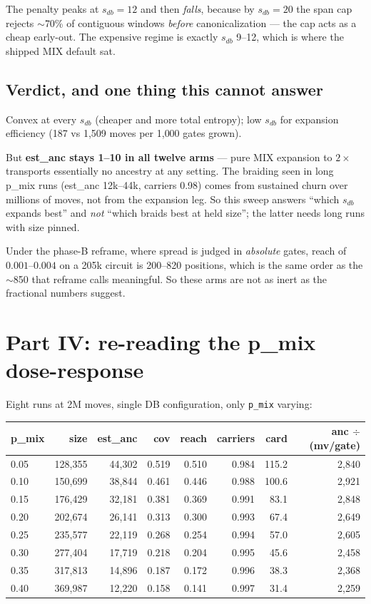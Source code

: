 \documentclass[11pt]{article}
\newcommand{\code}[1]{\texttt{#1}}
\begin{document}
The penalty peaks at $s_{db}=12$ and then \emph{falls}, because by $s_{db}=20$
the span cap rejects $\sim$70\% of contiguous windows \emph{before}
canonicalization --- the cap acts as a cheap early-out. The expensive regime is
exactly $s_{db}$ 9--12, which is where the shipped MIX default sat.

\subsection{Verdict, and one thing this cannot answer}

Convex at every $s_{db}$ (cheaper and more total entropy); low $s_{db}$ for
expansion efficiency (187 vs 1{,}509 moves per 1{,}000 gates grown).

But \textbf{est\_anc stays 1--10 in all twelve arms} --- pure MIX expansion to
$2\times$ transports essentially no ancestry at any setting. The braiding seen
in long p\_mix runs (est\_anc 12k--44k, carriers 0.98) comes from sustained
churn over millions of moves, not from the expansion leg. So this sweep
answers ``which $s_{db}$ expands best'' and \emph{not} ``which braids best at
held size''; the latter needs long runs with size pinned.

Under the phase-B reframe, where spread is judged in \emph{absolute} gates,
reach of $0.001$--$0.004$ on a 205k circuit is 200--820 positions, which is the
same order as the $\sim$850 that reframe calls meaningful. So these arms are
not as inert as the fractional numbers suggest.

\section{Part IV: re-reading the p\_mix dose-response}

Eight runs at 2M moves, single DB configuration, only \code{p\_mix} varying:

\begin{table}[h]\centering\small
\begin{tabular}{lrrrrrrr}
\toprule
p\_mix & size & est\_anc & cov & reach & carriers & card & anc $\div$ (mv/gate) \\
\midrule
0.05 & 128{,}355 & 44{,}302 & 0.519 & 0.510 & 0.984 & 115.2 & 2{,}840 \\
0.10 & 150{,}699 & 38{,}844 & 0.461 & 0.446 & 0.988 & 100.6 & 2{,}921 \\
0.15 & 176{,}429 & 32{,}181 & 0.381 & 0.369 & 0.991 & 83.1 & 2{,}848 \\
0.20 & 202{,}674 & 26{,}141 & 0.313 & 0.300 & 0.993 & 67.4 & 2{,}649 \\
0.25 & 235{,}577 & 22{,}119 & 0.268 & 0.254 & 0.994 & 57.0 & 2{,}605 \\
0.30 & 277{,}404 & 17{,}719 & 0.218 & 0.204 & 0.995 & 45.6 & 2{,}458 \\
0.35 & 317{,}813 & 14{,}896 & 0.187 & 0.172 & 0.996 & 38.3 & 2{,}368 \\
0.40 & 369{,}987 & 12{,}220 & 0.158 & 0.141 & 0.997 & 31.4 & 2{,}259 \\
\bottomrule
\end{tabular}
\end{table}
\end{document}
